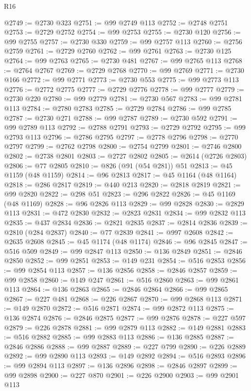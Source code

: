 \begin{lexlean}{R16}
\begin{coremodule}
@2749 := @2730 @323
@2751 := @99 @2749 @113
@2752 := @2748 @2751
@2753 := @2729 @2752
@2754 := @99 @2753
@2755 := @2730 @120
@2756 := @99 @2755
@2757 := @2730 @330
@2759 := @99 @2757 @113
@2760 := @2756 @2759
@2761 := @2729 @2760
@2762 := @99 @2761
@2763 := @2730 @125
@2764 := @99 @2763
@2765 := @2730 @481
@2767 := @99 @2765 @113
@2768 := @2764 @2767
@2769 := @2729 @2768
@2770 := @99 @2769
@2771 := @2730 @166
@2772 := @99 @2771
@2773 := @2730 @553
@2775 := @99 @2773 @113
@2776 := @2772 @2775
@2777 := @2729 @2776
@2778 := @99 @2777
@2779 := @2730 @220
@2780 := @99 @2779
@2781 := @2730 @567
@2783 := @99 @2781 @113
@2784 := @2780 @2783
@2785 := @2729 @2784
@2786 := @99 @2785
@2787 := @2730 @271
@2788 := @99 @2787
@2789 := @2730 @592
@2791 := @99 @2789 @113
@2792 := @2788 @2791
@2793 := @2729 @2792
@2795 := @99 @2793 @113
@2796 := @2786 @2795
@2797 := @2778 @2796
@2798 := @2770 @2797
@2799 := @2762 @2798
@2800 := @2754 @2799
@2801 := @2746 @2800
@2802 := @2738 @2801
@2803 := @2727 @2802
@2805 := @2614 (@2726 @2803)
@2806 := @77 @2805
@2810 := @826 (@91 (@54 @281)) @51
@2813 := @45 @1159 (@48 @1159)
@2814 := @96 @2813
@2817 := @45 @1164 (@48 @1164)
@2818 := @286 @2817
@2819 := @440 @213
@2820 := @2818 @2819
@2821 := @99 @2820
@2822 := @298 @51
@2823 := @296 @2822
@2826 := @45 @1169 (@48 @1169)
@2828 := @96 @2826 @113
@2829 := @99 @2828
@2830 := @2829 @113
@2831 := @472 @2830
@2832 := @2823 @2831
@2834 := @99 @2832 @113
@2835 := @437 @2834
@2836 := @2821 @2835
@2837 := @2814 @2836
@2839 := @2810 (@284 @2837)
@2840 := @77 @2839
@2841 := @997 @2608
@2842 := @2635 @2608
@2845 := @45 @1174 (@48 @1174)
@2846 := @96 @2845
@2847 := @516 @509
@2849 := @99 @2847 @113
@2850 := @136 @2849
@2851 := @2846 @2850
@2852 := @99 @2851
@2853 := @149 @231
@2854 := @516 @2853
@2856 := @99 @2854 @113
@2857 := @136 @2856
@2858 := @2846 @2857
@2859 := @99 @2858
@2860 := @149 @247
@2861 := @516 @2860
@2863 := @99 @2861 @113
@2864 := @136 @2863
@2865 := @2846 @2864
@2866 := @99 @2865
@2867 := @227 @481
@2868 := @226 @2867
@2870 := @99 @2868 @113
@2871 := @149 @2870
@2872 := @516 @2871
@2874 := @99 @2872 @113
@2875 := @136 @2874
@2876 := @2846 @2875
@2877 := @99 @2876
@2878 := @227 @597
@2879 := @226 @2878
@2881 := @99 @2879 @113
@2882 := @149 @2881
@2883 := @516 @2882
@2885 := @99 @2883 @113
@2886 := @136 @2885
@2887 := @2846 @2886
@2888 := @99 @2887
@2889 := @227 @799
@2890 := @226 @2889
@2892 := @99 @2890 @113
@2893 := @149 @2892
@2894 := @516 @2893
@2896 := @99 @2894 @113
@2897 := @136 @2896
@2898 := @2846 @2897
@2899 := @99 @2898
@2900 := @227 @870
@2901 := @226 @2900
@2903 := @99 @2901 @113

\end{coremodule}
\end{lexlean}

